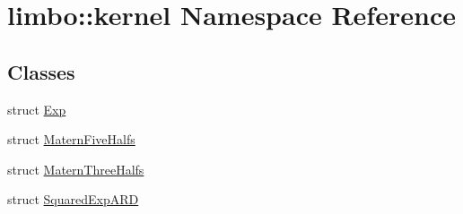 \hypertarget{namespacelimbo_1_1kernel}{}\section{limbo\+:\+:kernel Namespace Reference}
\label{namespacelimbo_1_1kernel}
\subsection*{Classes}
\begin{DoxyCompactItemize}
\item 
struct \hyperlink{structlimbo_1_1kernel_1_1_exp}{Exp}
\item 
struct \hyperlink{structlimbo_1_1kernel_1_1_matern_five_halfs}{Matern\+Five\+Halfs}
\item 
struct \hyperlink{structlimbo_1_1kernel_1_1_matern_three_halfs}{Matern\+Three\+Halfs}
\item 
struct \hyperlink{structlimbo_1_1kernel_1_1_squared_exp_a_r_d}{Squared\+Exp\+A\+R\+D}
\end{DoxyCompactItemize}
